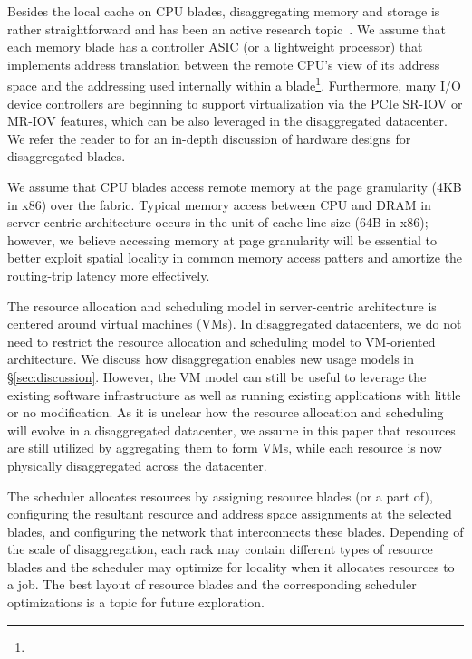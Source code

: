%
Besides the local cache on CPU blades, disaggregating memory and storage is rather straightforward and has been an active research topic~\cite{x1, x2, x3}. We assume that each memory blade has a controller ASIC (or a lightweight processor) that implements address translation between the remote CPU's view of its address space and the addressing used internally within a blade{\footnote{}}. Furthermore, many I/O device controllers are beginning to support virtualization via the PCIe SR-IOV or MR-IOV features, which can be also leveraged in the disaggregated datacenter. We refer the reader to \cite{x1, x2, x3} for an in-depth discussion of hardware designs for disaggregated blades.

We assume that CPU blades access remote memory at the page granularity (4KB in x86) over the fabric. Typical memory access between CPU and DRAM in server-centric architecture occurs in the unit of cache-line size (64B in x86); however, we believe accessing memory at page granularity will be essential to better exploit spatial locality in common memory access patters and amortize the routing-trip latency more effectively. 

The resource allocation and scheduling model in server-centric architecture is centered around virtual machines (VMs). In disaggregated datacenters, we do not need to restrict the resource allocation and scheduling model to VM-oriented architecture. We discuss how disaggregation enables new usage models in \S\ref{sec:discussion}. However, the VM model can still be useful to leverage the existing software infrastructure as well as running existing applications with little or no modification. As it is unclear how the resource allocation and scheduling will evolve in a disaggregated datacenter, we assume in this paper that resources are still utilized by aggregating them to form VMs, while each resource is now physically disaggregated across the datacenter.

The scheduler allocates resources by assigning resource blades (or a part of), configuring the resultant resource and address space assignments at the selected blades, and configuring the network that interconnects these blades. Depending of the scale of disaggregation, each rack may contain different types of resource blades and the scheduler may optimize for locality when it allocates resources to a job. The best layout of resource blades and the corresponding scheduler optimizations is a topic for future exploration.

